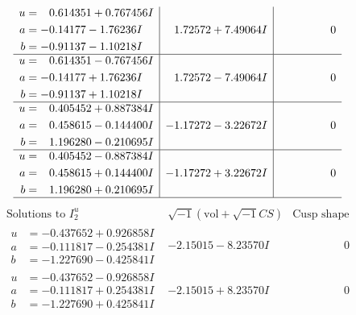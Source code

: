 \documentclass[1p]{elsarticle_modified}
\theoremstyle{definition}
\newcommand{\I}{\sqrt{-1}}
\begin{document}
$$\begin{array}{c|c|c}
\begin{aligned}
u &= \phantom{-}0.614351 + 0.767456 I \\
a &= -0.14177 - 1.76236 I \\
b &= -0.91137 - 1.10218 I\end{aligned}
 & \phantom{-}1.72572 + 7.49064 I & \phantom{-0.000000 } 0 \\ \hline\begin{aligned}
u &= \phantom{-}0.614351 - 0.767456 I \\
a &= -0.14177 + 1.76236 I \\
b &= -0.91137 + 1.10218 I\end{aligned}
 & \phantom{-}1.72572 - 7.49064 I & \phantom{-0.000000 } 0 \\ \hline\begin{aligned}
u &= \phantom{-}0.405452 + 0.887384 I \\
a &= \phantom{-}0.458615 - 0.144400 I \\
b &= \phantom{-}1.196280 - 0.210695 I\end{aligned}
 & -1.17272 - 3.22672 I & \phantom{-0.000000 } 0 \\ \hline\begin{aligned}
u &= \phantom{-}0.405452 - 0.887384 I \\
a &= \phantom{-}0.458615 + 0.144400 I \\
b &= \phantom{-}1.196280 + 0.210695 I\end{aligned}
 & -1.17272 + 3.22672 I & \phantom{-0.000000 } 0\\
 \hline 
 \end{array}$$\newpage$$\begin{array}{c|c|c}  
\text{Solutions to }I^u_{2}& \I (\text{vol} + \sqrt{-1}CS) & \text{Cusp shape}\\
 \hline 
\begin{aligned}
u &= -0.437652 + 0.926858 I \\
a &= -0.111817 - 0.254381 I \\
b &= -1.227690 - 0.425841 I\end{aligned}
 & -2.15015 - 8.23570 I & \phantom{-0.000000 } 0 \\ \hline\begin{aligned}
u &= -0.437652 - 0.926858 I \\
a &= -0.111817 + 0.254381 I \\
b &= -1.227690 + 0.425841 I\end{aligned}
 & -2.15015 + 8.23570 I & \phantom{-0.000000 } 0 \\ \hline\begin{aligned}

\end{aligned}
\end{array}$$
\end{document}
